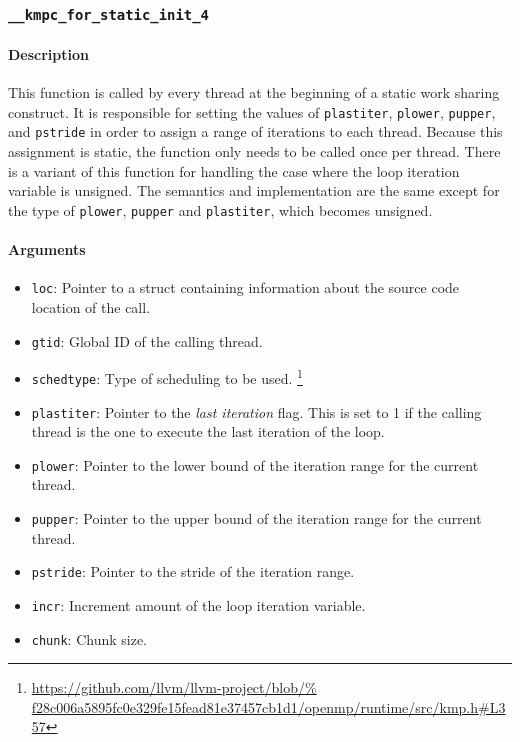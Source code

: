 \subsubsection{\texttt{\_\_kmpc\_for\_static\_init\_4}}

\paragraph{Description} This function is called by every thread at the beginning of a static work
sharing construct. It is responsible for setting the values of \texttt{plastiter}, \texttt{plower},
\texttt{pupper}, and \texttt{pstride} in order to assign a range of iterations to each thread.
Because this assignment is static, the function only needs to be called once per thread. There is a
variant of this function for handling the case where the loop iteration variable is unsigned. The
semantics and implementation are the same except for the type of \texttt{plower}, \texttt{pupper}
and \texttt{plastiter}, which becomes unsigned.

\paragraph{Arguments}
\begin{itemize}
	\item \texttt{loc}: Pointer to a struct containing information about the source code location
	      of the call.
	\item \texttt{gtid}: Global ID of the calling thread.
	\item \texttt{schedtype}: Type of scheduling to be used.
	      \footnote{\url{
			      https://github.com/llvm/llvm-project/blob/%
			      f28c006a5895fc0e329fe15fead81e37457cb1d1/openmp/runtime/src/kmp.h\#L357}}
	\item \texttt{plastiter}: Pointer to the \emph{last iteration} flag. This is set to 1 if the
	      calling thread is the one to execute the last iteration of the loop.
	\item \texttt{plower}: Pointer to the lower bound of the iteration range for the current thread.
	\item \texttt{pupper}: Pointer to the upper bound of the iteration range for the current thread.
	\item \texttt{pstride}: Pointer to the stride of the iteration range.
	\item \texttt{incr}: Increment amount of the loop iteration variable.
	\item \texttt{chunk}: Chunk size.
\end{itemize}

